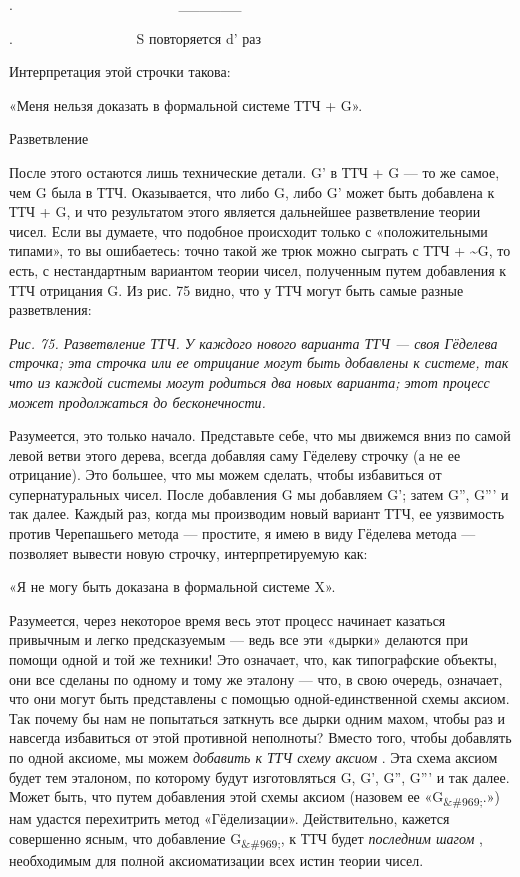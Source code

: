 \documentclass[../main.tex]{subfiles}
\begin{document}
.~~~~~~~~~~~~~~~~~~~~~~~ \textbar\_\_\_\_\_\_\textbar{}

.~~~~~~~~~~~~~~~~~ S повторяется d' раз

Интерпретация этой строчки такова:

«Меня нельзя доказать в формальной системе ТТЧ + G».

Разветвление

После этого остаются лишь технические детали. G' в ТТЧ + G --- то же самое, чем G была в ТТЧ. Оказывается, что либо G, либо G' может быть добавлена к ТТЧ + G, и что результатом этого является дальнейшее разветвление теории чисел. Если вы думаете, что подобное происходит только с «положительными типами», то вы ошибаетесь: точно такой же трюк можно сыграть с ТТЧ + \textasciitilde G, то есть, с нестандартным вариантом теории чисел, полученным путем добавления к ТТЧ отрицания G. Из рис. 75 видно, что у ТТЧ могут быть самые разные разветвления:

\emph{Рис. 75. Разветвление ТТЧ. У каждого нового варианта ТТЧ --- своя Гёделева строчка; эта строчка или ее отрицание могут быть добавлены к системе, так что из каждой системы могут родиться два новых варианта; этот процесс может продолжаться до бесконечности.}

Разумеется, это только начало. Представьте себе, что мы движемся вниз по самой левой ветви этого дерева, всегда добавляя саму Гёделеву строчку (а не ее отрицание). Это большее, что мы можем сделать, чтобы избавиться от супернатуральных чисел. После добавления G мы добавляем G'; затем G'', G''' и так далее. Каждый раз, когда мы производим новый вариант ТТЧ, ее уязвимость против Черепашьего метода --- простите, я имею в виду Гёделева метода --- позволяет вывести новую строчку, интерпретируемую как:

«Я не могу быть доказана в формальной системе X».

Разумеется, через некоторое время весь этот процесс начинает казаться привычным и легко предсказуемым --- ведь все эти «дырки» делаются при помощи одной и той же техники! Это означает, что, как типографские объекты, они все сделаны по одному и тому же эталону --- что, в свою очередь, означает, что они могут быть представлены с помощью одной-единственной схемы аксиом. Так почему бы нам не попытаться заткнуть все дырки одним махом, чтобы раз и навсегда избавиться от этой противной неполноты? Вместо того, чтобы добавлять по одной аксиоме, мы можем \emph{добавить к ТТЧ схему аксиом} . Эта схема аксиом будет тем эталоном, по которому будут изготовляться G, G', G'', G''' и так далее. Может быть, что путем добавления этой схемы аксиом (назовем ее «G\textsubscript{\&\#969;}.») нам удастся перехитрить метод «Гёделизации». Действительно, кажется совершенно ясным, что добавление G\textsubscript{\&\#969;}, к ТТЧ будет \emph{последним шагом} , необходимым для полной аксиоматизации всех истин теории чисел.
\end{document}
